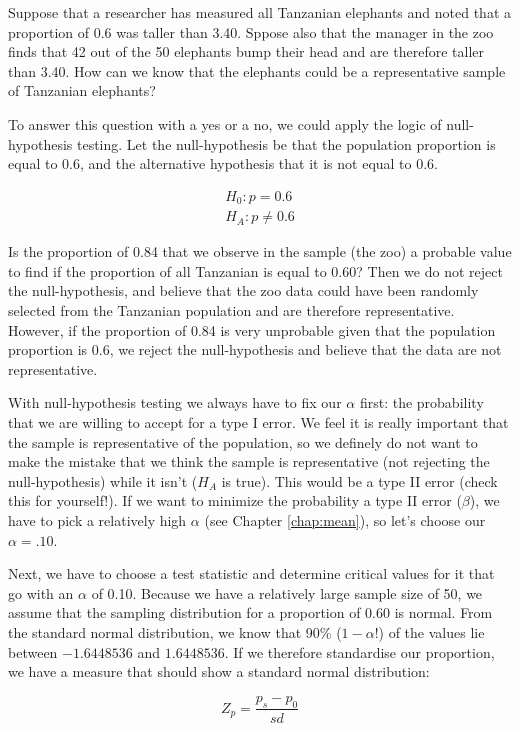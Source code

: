 Suppose that a researcher has measured all Tanzanian elephants and noted that a proportion of 0.6 was taller than 3.40. Sppose also that the manager in the zoo finds that 42 out of the 50 elephants bump their head and are therefore taller than 3.40. How can we know that the elephants could be a representative sample of Tanzanian elephants? 

To answer this question with a yes or a no, we could apply the logic of null-hypothesis testing. Let the null-hypothesis be that the population proportion is equal to 0.6, and the alternative hypothesis that it is not equal to 0.6. 

\begin{eqnarray}
H_0: p = 0.6 \\
H_A: p \neq 0.6
\end{eqnarray}

Is the proportion of 0.84 that we observe in the sample (the zoo) a probable value to find if the proportion of all Tanzanian is equal to 0.60? Then we do not reject the null-hypothesis, and believe that the zoo data could have been randomly selected from the Tanzanian population and are therefore representative. However, if the proportion of 0.84 is very unprobable given that the population proportion is 0.6, we reject the null-hypothesis and believe that the data are not representative.

With null-hypothesis testing we always have to fix our $\alpha$ first: the probability that we are willing to accept for a type I error. We feel it is really important that the sample is representative of the population, so we definely do not want to make the mistake that we think the sample is representative (not rejecting the null-hypothesis) while it isn't ($H_A$ is true). This would be a type II error (check this for yourself!). If we want to minimize the probability a type II error ($\beta$), we have to pick a relatively high $\alpha$ (see Chapter \ref{chap:mean}), so let's choose our $\alpha = .10$. 

Next, we have to choose a test statistic and determine critical values for it that go with an $\alpha$ of 0.10. Because we have a relatively large sample size of 50, we assume that the sampling distribution for a proportion of 0.60 is normal. From the standard normal distribution, we know that 90\% ($1-\alpha$!) of the values lie between $-1.6448536$ and $1.6448536$. If we therefore standardise our proportion, we have a measure that should show a standard normal distribution:

\begin{equation}
Z_p = \frac{p_s - p_0}{sd} 
\end{equation}

